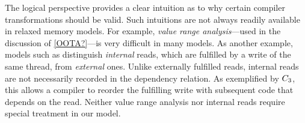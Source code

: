 The logical perspective provides a clear intuition as to why certain compiler
transformations should be valid.  Such intuitions are not always readily
available in relaxed memory models.  For example, \emph{value range
  analysis}---used in the discussion of \eqref{OOTA?}---is very difficult in
many models.  As another example, models such as \armeight{} distinguish
\emph{internal} reads, which are fulfilled by a write of the same thread,
from \emph{external} ones.  Unlike externally fulfilled reads, internal reads
are not necessarily recorded in the dependency relation.  As exemplified by
$C_3$, this allows a compiler to reorder the fulfilling write with
subsequent code that depends on the read.  Neither value range analysis nor
internal reads require special treatment in our model.





